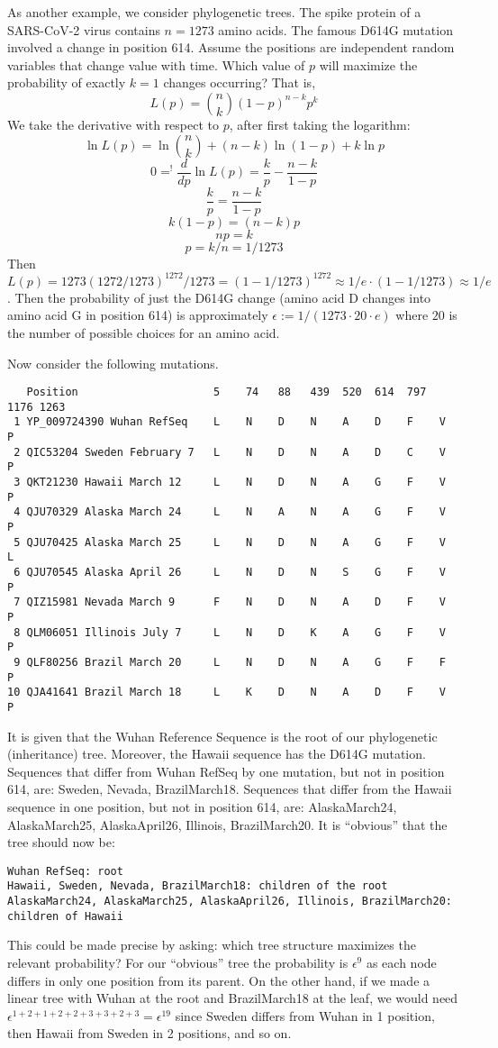 As another example, we consider phylogenetic trees.
The spike protein of a SARS-CoV-2 virus contains $n=1273$ amino acids.
The famous D614G mutation involved a change in position 614.
Assume the positions are independent random variables that change value with time.
Which value of $p$ will maximize the probability of exactly $k=1$ changes occurring? That is,
\[
	L(p) = \binom{n}{k} (1-p)^{n-k}p^k
\]
We take the derivative with respect to $p$, after first taking the logarithm:
\[
	\ln L(p) = \ln \binom{n}{k} + (n-k)\ln(1-p) + k\ln p
\]
\[
	0 =^! \frac{d}{dp}\ln L(p) = \frac{k}p - \frac{n-k}{1-p}
\]
\[
	\frac{k}p = \frac{n-k}{1-p}
\]
\[
	k(1-p)=(n-k)p
\]
\[
	np = k 
\]
\[
	p = k/n = 1/1273
\]
Then $L(p)=1273 (1272/1273)^{1272}/1273 = (1-1/1273)^{1272}\approx 1/e\cdot (1-1/1273)\approx 1/e$.
Then the probability of just the D614G change (amino acid D changes into amino acid G in position 614) is approximately $\epsilon := 1/(1273\cdot 20\cdot e)$ where $20$ is the number of possible choices for an amino acid.

Now consider the following mutations.
\begin{verbatim}
   Position                     5    74   88   439  520  614  797  1176 1263
 1 YP_009724390 Wuhan RefSeq    L    N    D    N    A    D    F    V    P
 2 QIC53204 Sweden February 7   L    N    D    N    A    D    C    V    P
 3 QKT21230 Hawaii March 12     L    N    D    N    A    G    F    V    P
 4 QJU70329 Alaska March 24     L    N    A    N    A    G    F    V    P
 5 QJU70425 Alaska March 25     L    N    D    N    A    G    F    V    L
 6 QJU70545 Alaska April 26     L    N    D    N    S    G    F    V    P
 7 QIZ15981 Nevada March 9      F    N    D    N    A    D    F    V    P
 8 QLM06051 Illinois July 7     L    N    D    K    A    G    F    V    P
 9 QLF80256 Brazil March 20     L    N    D    N    A    G    F    F    P
10 QJA41641 Brazil March 18     L    K    D    N    A    D    F    V    P
\end{verbatim}
It is given that the Wuhan Reference Sequence is the root of our phylogenetic (inheritance) tree.
Moreover, the Hawaii sequence has the D614G mutation.
Sequences that differ from Wuhan RefSeq by one mutation, but not in position 614, are:
Sweden, Nevada, BrazilMarch18.
Sequences that differ from the Hawaii sequence in one position, but not in position 614, are:
AlaskaMarch24, AlaskaMarch25, AlaskaApril26, Illinois, BrazilMarch20.
It is ``obvious'' that the tree should now be:
\begin{verbatim}
Wuhan RefSeq: root
Hawaii, Sweden, Nevada, BrazilMarch18: children of the root
AlaskaMarch24, AlaskaMarch25, AlaskaApril26, Illinois, BrazilMarch20: children of Hawaii
\end{verbatim}
This could be made precise by asking: which tree structure maximizes the relevant probability?
For our ``obvious'' tree the probability is $\epsilon^9$ as each node differs in only one position from its parent.
On the other hand, if we made a linear tree with Wuhan at the root and BrazilMarch18 at the leaf, we would need
$\epsilon^{1+2+1+2+2+3+3+2+3}=\epsilon^{19}$ since Sweden differs from Wuhan in 1 position, then Hawaii from Sweden in 2 positions, and so on.

